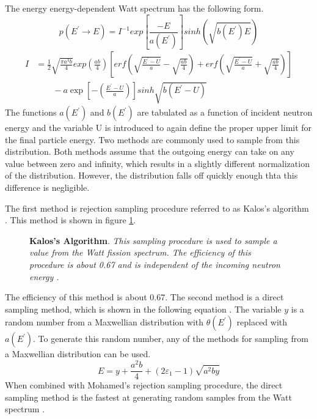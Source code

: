 The energy energy-dependent Watt spectrum has the following form.
\begin{equation}
  p(E^{'} \to E) = I^{-1}exp\left[\frac{-E}{a(E^{'})}\right]
  sinh\left(\sqrt{b(E^{'})E}
  \right)
\end{equation}
\begin{align}
  I & = \frac{1}{2}\sqrt{\frac{\pi a^3b}{4}}exp\left(\frac{ab}{4}\right)\left[
    erf\left(\sqrt{\frac{E^{'}-U}{a}} - \sqrt{\frac{ab}{4}}\right) +
    erf\left(\sqrt{\frac{E^{'}-U}{a}} + \sqrt{\frac{ab}{4}}\right)\right] 
  \nonumber \\
  & \qquad - a \exp{\left[-\left(\frac{E^{'}-U}{a}\right)\right]}
  sinh\sqrt{b(E^{'}-U)}
\end{align}
The functions $a(E^{'})$ and $b(E^{'})$ are tabulated as a function of incident 
neutron energy and the variable U is introduced to again define the proper 
upper limit for the final particle energy. Two methods are commonly used to
sample from this distribution. Both methods assume that the outgoing energy
can take on any value between zero and infinity, which results in a slightly
different normalization of the distribution. However, the distribution falls
off quickly enough thta this difference is negligible.

The first method is rejection sampling procedure referred to as Kalos's 
algorithm \citep{mohamed_efficient_2011}. This method is shown in figure
\ref{fig:Kalos_algorithm}. 
\begin{figure}[t!]
  \begin{center}
    \def\svgwidth{190bp}
    
  \end{center}
  \caption{\textbf{Kalos's Algorithm}.
    \textit{This sampling procedure is used to sample a value from the
      Watt fission spectrum. The efficiency of this procedure is about
      0.67 and is independent of the incoming neutron energy
      \citep{mohamed_efficient_2011}.}}
  \label{fig:Kalos_algorithm}
\end{figure}
The efficiency of this method is about 0.67. The 
second method is a direct sampling method, which is shown in the following
equation \citep{mohamed_efficient_2011}. The variable $y$ is a random number
from a Maxwellian distribution with $\theta(E^{'})$ replaced with $a(E^{'})$.
To generate this random number, any of the methods for sampling from a 
Maxwellian distribution can be used. 
\begin{equation}
  E = y + \frac{a^2b}{4} + (2\varepsilon_1-1)\sqrt{a^2by}
\end{equation}
When combined with Mohamed's rejection sampling procedure, the direct sampling
method is the fastest at generating random samples from the Watt spectrum
\citep{mohamed_efficient_2011}.

